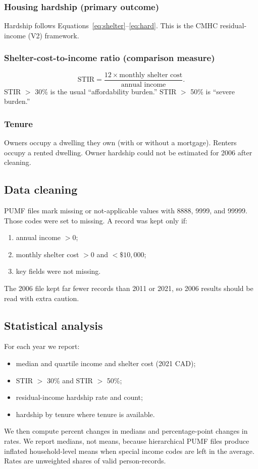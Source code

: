 \documentclass[11pt,letterpaper]{article}
\begin{document}
\subsubsection{Housing hardship (primary outcome)}

Hardship follows Equations~\eqref{eq:shelter}--\eqref{eq:hard}.
This is the CMHC residual-income (V2) framework.

\subsubsection{Shelter-cost-to-income ratio (comparison measure)}

\[
\text{STIR} = \frac{12 \times \text{monthly shelter cost}}{\text{annual income}}.
\]
STIR $>$ 30\% is the usual ``affordability burden.''
STIR $>$ 50\% is ``severe burden.''

\subsubsection{Tenure}

Owners occupy a dwelling they own (with or without a mortgage).
Renters occupy a rented dwelling.
Owner hardship could not be estimated for 2006 after cleaning.

\subsection{Data cleaning}
\label{sec:clean}

PUMF files mark missing or not-applicable values with 8888, 9999, and 99999.
Those codes were set to missing.
A record was kept only if:
\begin{enumerate}[leftmargin=1.6em]
  \item annual income $> 0$;
  \item monthly shelter cost $> 0$ and $< \$10{,}000$;
  \item key fields were not missing.
\end{enumerate}
The 2006 file kept far fewer records than 2011 or 2021, so 2006 results should be read with extra caution.

\subsection{Statistical analysis}
\label{sec:stats}

For each year we report:
\begin{itemize}[leftmargin=1.4em]
  \item median and quartile income and shelter cost (2021 CAD);
  \item STIR $>$ 30\% and STIR $>$ 50\%;
  \item residual-income hardship rate and count;
  \item hardship by tenure where tenure is available.
\end{itemize}
We then compute percent changes in medians and percentage-point changes in rates.
We report medians, not means, because hierarchical PUMF files produce inflated household-level means when special income codes are left in the average.
Rates are unweighted shares of valid person-records.
\end{document}
